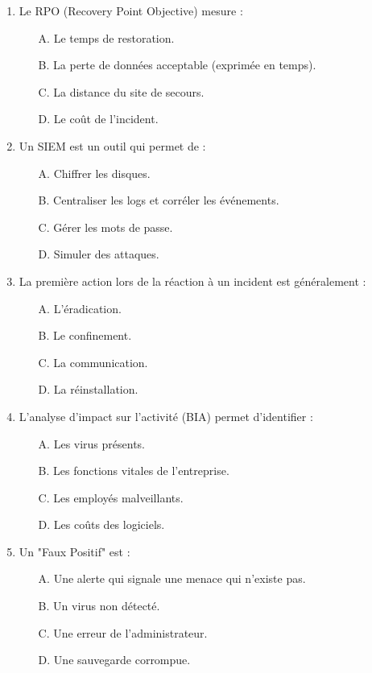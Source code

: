 \begin{enumerate}
    \item Le RPO (Recovery Point Objective) mesure :
    \begin{itemize}
        \item[A.] Le temps de restoration.
        \item[B.] La perte de données acceptable (exprimée en temps).
        \item[C.] La distance du site de secours.
        \item[D.] Le coût de l'incident.
    \end{itemize}

    \item Un SIEM est un outil qui permet de :
    \begin{itemize}
        \item[A.] Chiffrer les disques.
        \item[B.] Centraliser les logs et corréler les événements.
        \item[C.] Gérer les mots de passe.
        \item[D.] Simuler des attaques.
    \end{itemize}

    \item La première action lors de la réaction à un incident est généralement :
    \begin{itemize}
        \item[A.] L'éradication.
        \item[B.] Le confinement.
        \item[C.] La communication.
        \item[D.] La réinstallation.
    \end{itemize}

    \item L'analyse d'impact sur l'activité (BIA) permet d'identifier :
    \begin{itemize}
        \item[A.] Les virus présents.
        \item[B.] Les fonctions vitales de l'entreprise.
        \item[C.] Les employés malveillants.
        \item[D.] Les coûts des logiciels.
    \end{itemize}

    \item Un "Faux Positif" est :
    \begin{itemize}
        \item[A.] Une alerte qui signale une menace qui n'existe pas.
        \item[B.] Un virus non détecté.
        \item[C.] Une erreur de l'administrateur.
        \item[D.] Une sauvegarde corrompue.
    \end{itemize}


\end{enumerate}
